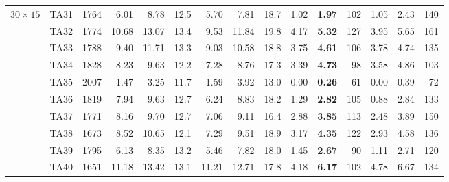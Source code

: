 \begin{table}[p]
\begin{tabular}{ll r | rr r | rr r | rr r | rr r}
\hline
$30\times15$ & TA31 & 1764 & 6.01 & 8.78 & 12.5 & 5.70 & 7.81 & 18.7 & 1.02 & \textbf{1.97} & 102 & 1.05 & 2.43 & 140 \\
 & TA32 & 1774 & 10.68 & 13.07 & 13.4 & 9.53 & 11.84 & 19.8 & 4.17 & \textbf{5.32} & 127 & 3.95 & 5.65 & 161 \\
 & TA33 & 1788 & 9.40 & 11.71 & 13.3 & 9.03 & 10.58 & 18.8 & 3.75 & \textbf{4.61} & 106 & 3.78 & 4.74 & 135 \\
 & TA34 & 1828 & 8.23 & 9.63 & 12.2 & 7.28 & 8.76 & 17.3 & 3.39 & \textbf{4.73} & 98 & 3.58 & 4.86 & 103 \\
 & TA35 & 2007 & 1.47 & 3.25 & 11.7 & 1.59 & 3.92 & 13.0 & 0.00 & \textbf{0.26} & 61 & 0.00 & 0.39 & 72 \\
 & TA36 & 1819 & 7.94 & 9.63 & 12.7 & 6.24 & 8.83 & 18.2 & 1.29 & \textbf{2.82} & 105 & 0.88 & 2.84 & 133 \\
 & TA37 & 1771 & 8.16 & 9.70 & 12.7 & 7.06 & 9.11 & 16.4 & 2.88 & \textbf{3.85} & 113 & 2.48 & 3.89 & 150 \\
 & TA38 & 1673 & 8.52 & 10.65 & 12.1 & 7.29 & 9.51 & 18.9 & 3.17 & \textbf{4.35} & 122 & 2.93 & 4.58 & 136 \\
 & TA39 & 1795 & 6.13 & 8.35 & 13.2 & 5.46 & 7.82 & 18.0 & 1.45 & \textbf{2.67} & 90 & 1.11 & 2.71 & 120 \\
 & TA40 & 1651 & 11.18 & 13.42 & 13.1 & 11.21 & 12.71 & 17.8 & 4.18 & \textbf{6.17} & 102 & 4.78 & 6.67 & 134 \\
\hline
\end{tabular}
\end{table}
